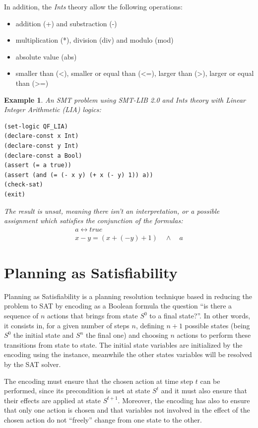 \documentclass{report}
\theoremstyle{plain}
\newtheorem{example}{Example}[section]
\begin{document}
In addition, the \emph{Ints} theory allow the following operations:
\begin{itemize}
    \item addition (+) and substraction (-)
    \item multiplication (*), division (div) and modulo (mod)
    \item absolute value (abs)
    \item smaller than (\textless), smaller or equal than (\textless=), larger than (\textgreater), larger or equal than (\textgreater=)
\end{itemize}

\vspace{1\baselineskip}

\begin{example} An SMT problem using \emph{SMT-LIB 2.0} and \emph{Ints} theory with Linear Integer Arithmetic (LIA) logics:
\begin{lstlisting}
(set-logic QF_LIA)
(declare-const x Int)
(declare-const y Int)
(declare-const a Bool)
(assert (= a true))
(assert (and (= (- x y) (+ x (- y) 1)) a))
(check-sat)
(exit)
\end{lstlisting}

The result is unsat, meaning there isn't an interpretation, or a possible assignment which satisfies the conjunction of the formulas:
\begin{gather}
a \leftrightarrow true \\
x - y = (x + (-y) + 1) \quad \wedge \quad a
\end{gather}
\end{example}

\section{Planning as Satisfiability}
Planning as Satisfiability is a planning resolution technique based in reducing the problem to SAT by encoding as a Boolean formula the question ``is there a sequence of $n$ actions that brings from state $S^0$ to a final state?''. In other words, it consists in, for a given number of steps $n$, defining $n+1$ possible states (being $S^0$ the initial state and $S^n$ the final one) and choosing $n$ actions to perform these transitions from state to state. The initial state variables are initialized by the encoding using the instance, meanwhile the other states variables will be resolved by the SAT solver.

The encoding must ensure that the chosen action at time step $t$ can be performed, since its precondition is met at state $S^t$ and it must also ensure that their effects are applied at state $S^{t+1}$. Moreover, the encoding has also to ensure that only one action is chosen and that variables not involved in the effect of the chosen action do not ``freely'' change from one state to the other.
\end{document}
